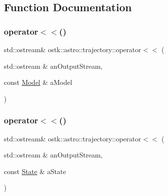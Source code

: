 \subsection{Function Documentation}
\mbox{\label{namespaceostk_1_1astro_1_1trajectory_af26a26e9fbf975e9b2a79b7f064ede6b}} 
\subsubsection{\texorpdfstring{operator$<$$<$()}{operator<<()}\hspace{0.1cm}{\footnotesize\ttfamily [1/2]}}
{\footnotesize\ttfamily std\+::ostream\& ostk\+::astro\+::trajectory\+::operator$<$$<$ (\begin{DoxyParamCaption}\item[{std\+::ostream \&}]{an\+Output\+Stream,  }\item[{const \hyperlink{classostk_1_1astro_1_1trajectory_1_1_model}{Model} \&}]{a\+Model }\end{DoxyParamCaption})}

\mbox{\label{namespaceostk_1_1astro_1_1trajectory_a995329a575cfbec97abc14f605cf5cfa}} 
\subsubsection{\texorpdfstring{operator$<$$<$()}{operator<<()}\hspace{0.1cm}{\footnotesize\ttfamily [2/2]}}
{\footnotesize\ttfamily std\+::ostream\& ostk\+::astro\+::trajectory\+::operator$<$$<$ (\begin{DoxyParamCaption}\item[{std\+::ostream \&}]{an\+Output\+Stream,  }\item[{const \hyperlink{classostk_1_1astro_1_1trajectory_1_1_state}{State} \&}]{a\+State }\end{DoxyParamCaption})}

